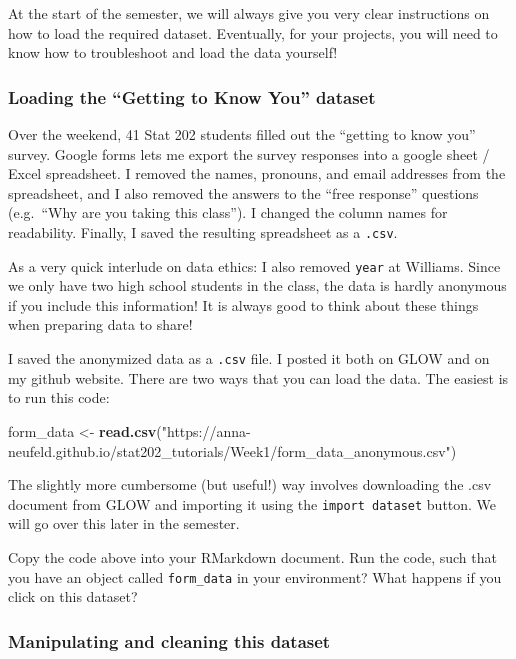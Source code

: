 \documentclass[
]{article}
\newenvironment{Shaded}{\begin{snugshade}}{\end{snugshade}}
\newcommand{\FunctionTok}[1]{\textcolor[rgb]{0.13,0.29,0.53}{\textbf{#1}}}
\newcommand{\NormalTok}[1]{#1}
\newcommand{\OtherTok}[1]{\textcolor[rgb]{0.56,0.35,0.01}{#1}}
\newcommand{\StringTok}[1]{\textcolor[rgb]{0.31,0.60,0.02}{#1}}
\begin{document}
At the start of the semester, we will always give you very clear
instructions on how to load the required dataset. Eventually, for your
projects, you will need to know how to troubleshoot and load the data
yourself!

\subsubsection{Loading the ``Getting to Know You''
dataset}\label{loading-the-getting-to-know-you-dataset}

Over the weekend, 41 Stat 202 students filled out the ``getting to know
you'' survey. Google forms lets me export the survey responses into a
google sheet / Excel spreadsheet. I removed the names, pronouns, and
email addresses from the spreadsheet, and I also removed the answers to
the ``free response'' questions (e.g.~``Why are you taking this
class''). I changed the column names for readability. Finally, I saved
the resulting spreadsheet as a \texttt{.csv}.

As a very quick interlude on data ethics: I also removed \texttt{year}
at Williams. Since we only have two high school students in the class,
the data is hardly anonymous if you include this information! It is
always good to think about these things when preparing data to share!

I saved the anonymized data as a \texttt{.csv} file. I posted it both on
GLOW and on my github website. There are two ways that you can load the
data. The easiest is to run this code:

\begin{Shaded}
\begin{Highlighting}[]
\NormalTok{form\_data }\OtherTok{\textless{}{-}} \FunctionTok{read.csv}\NormalTok{(}\StringTok{"https://anna{-}neufeld.github.io/stat202\_tutorials/Week1/form\_data\_anonymous.csv"}\NormalTok{)}
\end{Highlighting}
\end{Shaded}

The slightly more cumbersome (but useful!) way involves downloading the
.csv document from GLOW and importing it using the
\texttt{import\ dataset} button. We will go over this later in the
semester.

Copy the code above into your RMarkdown document. Run the code, such
that you have an object called \texttt{form\_data} in your environment?
What happens if you click on this dataset?

\subsubsection{Manipulating and cleaning this
dataset}\label{manipulating-and-cleaning-this-dataset}
\end{document}
